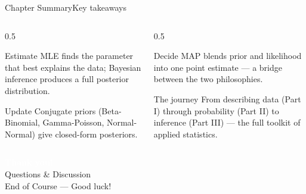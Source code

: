 \documentclass[aspectratio=169,11pt]{beamer}
\begin{document}
\begin{frame}{Chapter Summary}{Key takeaways}
  \begin{columns}[T]
    \begin{column}{0.5\textwidth}
      \begin{block}{Estimate}
        \small MLE finds the parameter that best explains the data;
        Bayesian inference produces a full posterior distribution.
      \end{block}
      \begin{exampleblock}{Update}
        \small Conjugate priors (Beta-Binomial, Gamma-Poisson,
        Normal-Normal) give closed-form posteriors.
      \end{exampleblock}
    \end{column}
    \begin{column}{0.5\textwidth}
      \begin{alertblock}{Decide}
        \small MAP blends prior and likelihood into one point estimate —
        a bridge between the two philosophies.
      \end{alertblock}
      \begin{block}{The journey}
        \small From describing data (Part I) through probability (Part II)
        to inference (Part III) — the full toolkit of applied statistics.
      \end{block}
    \end{column}
  \end{columns}
\end{frame}

{
\begin{frame}
  \vfill
  \begin{center}
    {\LARGE\textcolor{white}{\textbf{Thank you!}}}\\[0.6em]
    {\small\textcolor{PrimaryLight}{Questions \& Discussion}}\\[1.2em]
    {\footnotesize\textcolor{AccentYellow}{End of Course — Good luck!}}
  \end{center}
  \vfill
\end{frame}}
\end{document}
